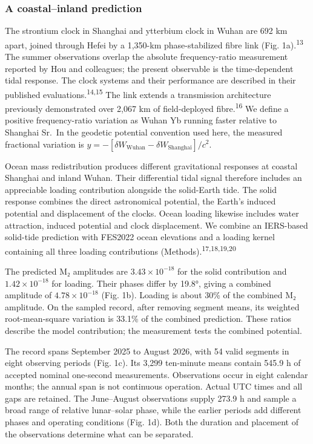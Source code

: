 \documentclass[
  12pt,
  a4paper,
]{article}
\begin{document}
\hypertarget{a-coastalinland-prediction}{%
\subsubsection{A coastal--inland
prediction}\label{a-coastalinland-prediction}}

The strontium clock in Shanghai and ytterbium clock in Wuhan are 692 km
apart, joined through Hefei by a 1,350-km phase-stabilized fibre link
(Fig. 1a).\textsuperscript{13} The summer observations overlap the
absolute frequency-ratio measurement reported by Hou and colleagues; the
present observable is the time-dependent tidal response. The clock
systems and their performance are described in their published
evaluations.\textsuperscript{14,15} The link extends a transmission
architecture previously demonstrated over 2,067 km of field-deployed
fibre.\textsuperscript{16} We define a positive frequency-ratio
variation as Wuhan Yb running faster relative to Shanghai Sr.~In the
geodetic potential convention used here, the measured fractional
variation is
\(y=-[\delta W_{\mathrm{Wuhan}}-\delta W_{\mathrm{Shanghai}}]/c^2\).

Ocean mass redistribution produces different gravitational responses at
coastal Shanghai and inland Wuhan. Their differential tidal signal
therefore includes an appreciable loading contribution alongside the
solid-Earth tide. The solid response combines the direct astronomical
potential, the Earth's induced potential and displacement of the clocks.
Ocean loading likewise includes water attraction, induced potential and
clock displacement. We combine an IERS-based solid-tide prediction with
FES2022 ocean elevations and a loading kernel containing all three
loading contributions (Methods).\textsuperscript{17,18,19,20}

The predicted M₂ amplitudes are \(3.43\times10^{-18}\) for the solid
contribution and \(1.42\times10^{-18}\) for loading. Their phases differ
by 19.8°, giving a combined amplitude of \(4.78\times10^{-18}\) (Fig.
1b). Loading is about 30\% of the combined M₂ amplitude. On the sampled
record, after removing segment means, its weighted root-mean-square
variation is 33.1\% of the combined prediction. These ratios describe
the model contribution; the measurement tests the combined potential.

The record spans September 2025 to August 2026, with 54 valid segments
in eight observing periods (Fig. 1c). Its 3,299 ten-minute means contain
545.9 h of accepted nominal one-second measurements. Observations occur
in eight calendar months; the annual span is not continuous operation.
Actual UTC times and all gaps are retained. The June--August
observations supply 273.9 h and sample a broad range of relative
lunar--solar phase, while the earlier periods add different phases and
operating conditions (Fig. 1d). Both the duration and placement of the
observations determine what can be separated.
\end{document}
